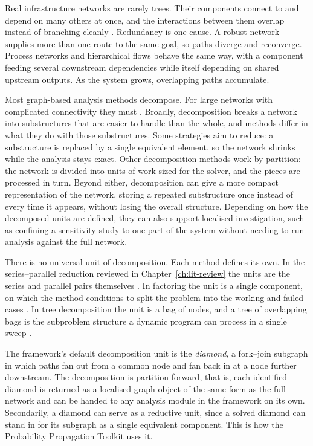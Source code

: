 \documentclass[12pt]{report}
\begin{document}
Real infrastructure networks are rarely trees. Their components connect to
and depend on many others at once, and the interactions between them
overlap instead of branching cleanly \cite{ouyang2014interdependent,buldyrev2010cascade}. Redundancy is one cause. A robust network supplies more than one route to the
same goal, so paths diverge and reconverge. Process networks and
hierarchical flows behave the same way, with a component feeding several
downstream dependencies while itself depending on shared upstream outputs.
As the system grows, overlapping paths accumulate.

Most graph-based analysis methods decompose. For large networks with complicated
connectivity they must \cite{perez2018sixty}. Broadly, decomposition breaks a network into substructures that
are easier to handle than the whole, and methods differ in what they do
with those substructures. Some strategies aim to reduce: a substructure is replaced by a
single equivalent element, so the network shrinks while the analysis stays
exact. Other decomposition methods work by partition: the network is divided into units of work sized
for the solver, and the pieces are processed in turn. Beyond either,
decomposition can give a more compact representation of the network,
storing a repeated substructure once instead of every time it appears,
without losing the overall structure. Depending on how the decomposed units are
defined, they can also support localised investigation, such as confining
a sensitivity study to one part of the system without needing to run
analysis against the full network.

There is no universal unit of decomposition. Each method defines its own. In the series--parallel reduction reviewed in
Chapter~\ref{ch:lit-review} the units are the series and parallel pairs
themselves \cite{satyanarayana1985linear}. In factoring the unit is a single
component, on which the method conditions to split the problem into the
working and failed cases \cite{satyanarayana1983factoring}. In tree
decomposition the unit is a bag of nodes, and a tree of overlapping bags is
the subproblem structure a dynamic program can process in a single sweep
\cite{robertson1986graphminors,goharshady2020treewidth}.

The framework's default decomposition unit is the \emph{diamond}, a
fork--join subgraph in which paths fan out from a common node and fan back in at a node further
downstream. The decomposition is partition-forward, that is, each identified diamond is
returned as a localised graph object of the same form as the full network and can be handed to
any analysis module in the framework on its own. Secondarily, a diamond can serve as a
reductive unit, since a solved diamond can stand in for its subgraph as a single equivalent
component. This is how the Probability Propagation Toolkit uses it.
\end{document}
